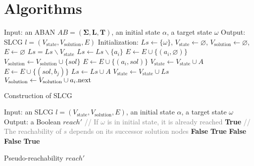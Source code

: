 \chapter{Algorithms}
\begin{algorithm}[ht]
\begin{algorithmic}
\State Input: an ABAN $AB=(\mathbf{\Sigma},\mathbf{L},\mathbf{T})$, an initial state $\alpha$, a target state $\omega$
\State Output: SLCG $l=(V_{\mathrm{state}},V_{\mathrm{solution}}, E)$
\State Initialization: 
$Ls\gets \{\omega\}$, $V_{\mathrm{state}}\gets\varnothing$, $V_{\mathrm{solution}}\gets \varnothing$, $E\gets \varnothing$
    \State $Ls=Ls\backslash V_{\mathrm{state}}$
		\State $Ls\gets Ls\backslash \{a_i\}$
			\State $E\gets E\cup \{(a_i,\varnothing)\} $
    	\Else
    		    \State $V_{\mathrm{solution}}\gets V_{\mathrm{solution}}\cup \{sol\}$
    		    \State $E\gets E\cup \{(a_i,sol)\} $
    			\State $V_{\mathrm{state}}\gets V_{\mathrm{state}}\cup {A}$
    				\State $E\gets E\cup \{(sol,b_j)\} $
    			\EndFor
    			\State $Ls\gets Ls\cup A$
                \State $V_{\mathrm{state}}\gets V_{\mathrm{state}}\cup Ls$
    		\EndFor
    		\State$V_{\mathrm{solution}}\gets V_{\mathrm{solution}}\cup a_i{\rm .next}$           
    	\EndIf
	\EndFor
\EndWhile
\State{}
\end{algorithmic}
\caption{Construction of SLCG}\label{AlgConstructLCG}
\end{algorithm}

\begin{algorithm}[ht]
\begin{algorithmic}
\State Input: an SLCG $l=(V_{\mathrm{state}}, {V_\mathrm{solution}},E)$, an initial state $\alpha$, a target state $\omega$
\State Output: a Boolean $reach'$
\State \textcolor{gray}{// If $\omega$ is in initial state, it is already reached}
\If {$\omega\in \alpha$}
   \Return \textbf{True}
\EndIf
\State \textcolor{gray}{// The reachability of $s$ depends on its successor solution nodes}
    \Return \textbf{False}
\EndIf
{}
    \Return \textbf{True}
    \EndIf
\EndFor
 \Return \textbf{False}
\EndProcedure
{}
    \Return \textbf{False}
    \EndIf
\EndFor
\Return \textbf{True}
\EndProcedure
\end{algorithmic}
\caption{Pseudo-reachability $reach'$}\label{algPseudo}
\end{algorithm}

